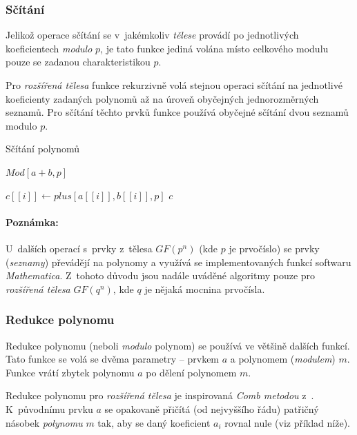 \documentclass[thesis=M,czech,hidelinks]{FITthesis}[2012/06/26]
\newcommand{\0}{{\textcolor[gray]{0.80}{0}}}
\newenvironment{algoritmus}{
    \floatname{algorithm}{Algoritmus}
    \begin{algorithm}
}{\end{algorithm}}
\begin{document}
\subsubsection{Sčítání}
Jelikož operace sčítání se v~jakémkoliv \emph{tělese} provádí po jednotlivých
koeficientech \emph{modulo} $p$, je tato funkce jediná volána místo celkového
modulu pouze se zadanou charakteristikou $p$.

Pro \emph{rozšířená tělesa} funkce rekurzivně volá stejnou operaci sčítání na
jednotlivé koeficienty zadaných polynomů až na úroveň obyčejných jednorozměrných
seznamů. Pro sčítání těchto prvků funkce používá obyčejné sčítání dvou seznamů
modulo $p$.

\begin{algoritmus}[!ht]
    \caption{Sčítání polynomů}
    \begin{algorithmic}[1]
        \State \Return $Mod[a+b,p]$
     \EndFunction
    \end{algorithmic}
    \begin{algorithmic}[1]
            \State $c[[i]] \gets plus[a[[i]],b[[i]],p]$
        \EndFor
        \State \Return $c$
     \EndFunction
    \end{algorithmic}
\end{algoritmus}

\paragraph{Poznámka:} U~dalších operací s~prvky z~tělesa $GF(p^n)$ (kde $p$ je
prvočíslo) se prvky (\emph{seznamy}) převádějí na polynomy a využívá se
implementovaných funkcí softwaru \emph{Mathematica}. Z~tohoto důvodu jsou nadále
uváděné algoritmy pouze pro \emph{rozšířená tělesa} $GF(q^n)$, kde $q$ je nějaká
mocnina prvočísla.

\subsubsection{Redukce polynomu}

Redukce polynomu (neboli \emph{modulo} polynom) se používá ve většině dalších
funkcí. Tato funkce se volá se dvěma parametry -- prvkem $a$ a polynomem
(\emph{modulem}) $m$. Funkce vrátí zbytek polynomu $a$ po dělení polynomem $m$.

Redukce polynomu pro \emph{rozšířená tělesa} je inspirovaná \emph{Comb metodou}
z~\cite{Merchan}. K~původnímu prvku $a$ se opakovaně přičítá (od nejvyššího
řádu) patřičný násobek \emph{polynomu} $m$ tak, aby se daný koeficient $a_i$
rovnal nule (viz příklad níže).
\end{document}

